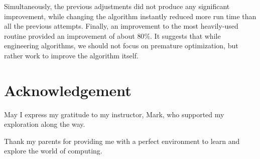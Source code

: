 \documentclass[a4paper]{article}
\begin{document}
Simultaneously, the previous adjustments did not produce any significant improvement, while changing the algorithm instantly reduced more run time than all the previous attempts. Finally, an improvement to the most heavily-used routine provided an improvement of about \(80\% \). It suggests that while engineering algorithms, we should not focus on premature optimization, but rather work to improve the algorithm itself. 

\section{Acknowledgement}
May I express my gratitude to my instructor, Mark, who supported my exploration along the way.

Thank my parents for providing me with a perfect environment to learn and explore the world of computing.

\printbibliography{}
\end{document}
